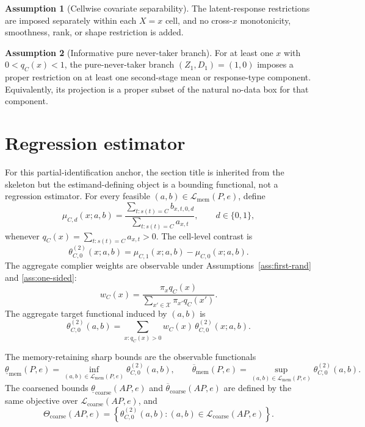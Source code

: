 \documentclass[11pt]{article}
\theoremstyle{definition}
\newtheorem{assumption}{Assumption}
\theoremstyle{plain}
\theoremstyle{remark}
\begin{document}
\begin{assumption}[Cellwise covariate separability]\label{ass:cellwise}
The latent-response restrictions are imposed separately within each \(X=x\) cell, and no cross-\(x\) monotonicity, smoothness, rank, or shape restriction is added.
\end{assumption}

\begin{assumption}[Informative pure never-taker branch]\label{ass:informative-never}
For at least one \(x\) with \(0<q_C(x)<1\), the pure-never-taker branch \((Z_1,D_1)=(1,0)\) imposes a proper restriction on at least one second-stage mean or response-type component.  Equivalently, its projection is a proper subset of the natural no-data box for that component.
\end{assumption}

\section{Regression estimator}
For this partial-identification anchor, the section title is inherited from the skeleton but the estimand-defining object is a bounding functional, not a regression estimator.  For every feasible \((a,b)\in\mathcal L_{\mathrm{mem}}(P,e)\), define
\[
\mu_{C,d}(x;a,b)=
\frac{\sum_{t:s(t)=C} b_{x,t,0,d}}{\sum_{t:s(t)=C} a_{x,t}},
\qquad d\in\{0,1\},
\]
whenever \(q_C(x)=\sum_{t:s(t)=C}a_{x,t}>0\).  The cell-level contrast is
\[
\theta_{C,0}^{(2)}(x;a,b)=\mu_{C,1}(x;a,b)-\mu_{C,0}(x;a,b).
\]
The aggregate complier weights are observable under Assumptions~\ref{ass:first-rand} and \ref{ass:one-sided}:
\[
w_C(x)=
\frac{\pi_x q_C(x)}{\sum_{x'\in\mathcal X}\pi_{x'}q_C(x')}.
\]
The aggregate target functional induced by \((a,b)\) is
\[
\theta_{C,0}^{(2)}(a,b)
=\sum_{x:q_C(x)>0} w_C(x)\,\theta_{C,0}^{(2)}(x;a,b).
\]

The memory-retaining sharp bounds are the observable functionals
\[
\underline\theta_{\mathrm{mem}}(P,e)=
\inf_{(a,b)\in\mathcal L_{\mathrm{mem}}(P,e)}
\theta_{C,0}^{(2)}(a,b),
\qquad
\overline\theta_{\mathrm{mem}}(P,e)=
\sup_{(a,b)\in\mathcal L_{\mathrm{mem}}(P,e)}
\theta_{C,0}^{(2)}(a,b).
\]
The coarsened bounds
\(\underline\theta_{\mathrm{coarse}}(A P,e)\) and
\(\overline\theta_{\mathrm{coarse}}(A P,e)\) are defined by the same objective over \(\mathcal L_{\mathrm{coarse}}(A P,e)\), and
\[
\Theta_{\mathrm{coarse}}(A P,e)=
\left\{\theta_{C,0}^{(2)}(a,b):(a,b)\in\mathcal L_{\mathrm{coarse}}(A P,e)\right\}.
\]
\end{document}
